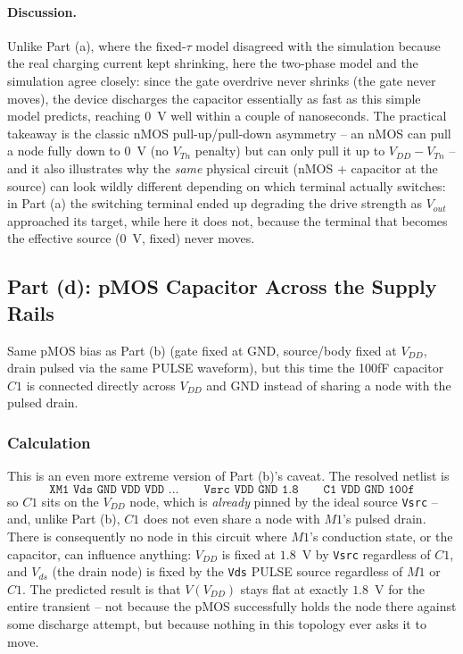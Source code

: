 \paragraph{Discussion.} Unlike Part (a), where the fixed-$\tau$ model disagreed with the simulation because the real charging current kept shrinking, here the two-phase model and the simulation agree closely: since the gate overdrive never shrinks (the gate never moves), the device discharges the capacitor essentially as fast as this simple model predicts, reaching $0$~V well within a couple of nanoseconds. The practical takeaway is the classic nMOS pull-up/pull-down asymmetry -- an nMOS can pull a node fully down to $0$~V (no $V_{Tn}$ penalty) but can only pull it up to $V_{DD}-V_{Tn}$ -- and it also illustrates why the \emph{same} physical circuit (nMOS + capacitor at the source) can look wildly different depending on which terminal actually switches: in Part (a) the switching terminal ended up degrading the drive strength as $V_{out}$ approached its target, while here it does not, because the terminal that becomes the effective source ($0$~V, fixed) never moves.

\subsection{Part (d): pMOS Capacitor Across the Supply Rails}

Same pMOS bias as Part (b) (gate fixed at GND, source/body fixed at $V_{DD}$, drain pulsed via the same PULSE waveform), but this time the 100fF capacitor $C1$ is connected directly across $V_{DD}$ and GND instead of sharing a node with the pulsed drain.

\subsubsection{Calculation}

This is an even more extreme version of Part (b)'s caveat. The resolved netlist is
\[
\texttt{XM1 Vds GND VDD VDD ...} \qquad \texttt{Vsrc VDD GND 1.8} \qquad \texttt{C1 VDD GND 100f}
\]
so $C1$ sits on the $V_{DD}$ node, which is \emph{already} pinned by the ideal source \texttt{Vsrc} -- and, unlike Part (b), $C1$ does not even share a node with $M1$'s pulsed drain. There is consequently no node in this circuit where $M1$'s conduction state, or the capacitor, can influence anything: $V_{DD}$ is fixed at $1.8$~V by \texttt{Vsrc} regardless of $C1$, and $V_{ds}$ (the drain node) is fixed by the \texttt{Vds} PULSE source regardless of $M1$ or $C1$. The predicted result is that $V(V_{DD})$ stays flat at exactly $1.8$~V for the entire transient -- not because the pMOS successfully holds the node there against some discharge attempt, but because nothing in this topology ever asks it to move.


